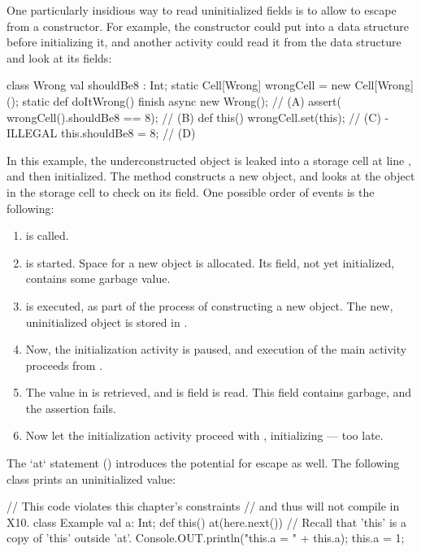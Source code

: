 One particularly insidious way to read uninitialized fields is to allow
 to escape from a constructor. For example, the constructor could
put  into a data structure before initializing it, and another
activity could read it from the data structure and look at its fields:
\begin{xten}
class Wrong {
  val shouldBe8 : Int;
  static Cell[Wrong] wrongCell = new Cell[Wrong]();
  static def doItWrong() {
     finish {
       async { new Wrong(); } // (A)
       assert( wrongCell().shouldBe8 == 8); // (B)
     }
  }
  def this() {
     wrongCell.set(this); // (C) - ILLEGAL
     this.shouldBe8 = 8; // (D)
  }
}
\end{xten}
\noindent
In this example, the underconstructed  object is leaked into a
storage cell at line , and then initialized.  The 
method constructs a new  object, and looks at the 
object in the storage cell to check on its  field.  One
possible order of events is the following:
\begin{enumerate}
\item {} is called.
\item {} is started.  Space for a new  object is allocated.
      Its  field, not yet initialized, contains some garbage
      value.
\item {} is executed, as part of the process of constructing a new
       object.  The new, uninitialized object is stored in
      .
\item Now, the initialization activity is paused, and execution of the main activity
      proceeds from .
\item The value in  is retrieved, and is  field
      is read.  This field contains garbage, and the assertion fails.
\item Now let the initialization activity proceed with ,
      initializing  --- too late.
\end{enumerate}

The \xcd`at` statement () introduces the potential for
escape as well. The following class prints an uninitialized value: 
\begin{xten}
// This code violates this chapter's constraints
// and thus will not compile in X10.
class Example {
  val a: Int;
  def this() { 
    at(here.next()) {
      // Recall that 'this' is a copy of 'this' outside 'at'.
      Console.OUT.println("this.a = " + this.a);
    }
    this.a = 1;
  }
}
\end{xten}
%


